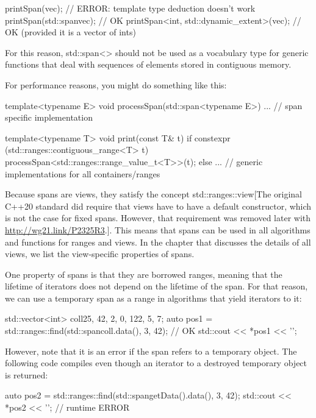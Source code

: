 \begin{cpp}
printSpan(vec); // ERROR: template type deduction doesn’t work
printSpan(std::span{vec}); // OK
printSpan<int, std::dynamic_extent>(vec); // OK (provided it is a vector of ints)
\end{cpp}

For this reason, std::span<> should not be used as a vocabulary type for generic functions that deal with sequences of elements stored in contiguous memory.

For performance reasons, you might do something like this:

\begin{cpp}
template<typename E>
void processSpan(std::span<typename E>) {
	... // span specific implementation
}

template<typename T>
void print(const T& t) {
	if constexpr (std::ranges::contiguous_range<T> t) {
		processSpan<std::ranges::range_value_t<T>>(t);
	}
	else {
		... // generic implementations for all containers/ranges
	}
}
\end{cpp}


Because spans are views, they satisfy the concept std::ranges::view[The original C++20 standard did require that views have to have a default constructor, which is not the case for fixed spans. However, that requirement was removed later with \url{http://wg21.link/P2325R3}.]. This means that spans can be used in all algorithms and functions for ranges and views. In the chapter that discusses the details of all views, we list the view-specific properties of spans.

One property of spans is that they are borrowed ranges, meaning that the lifetime of iterators does not depend on the lifetime of the span. For that reason, we can use a temporary span as a range in algorithms that yield iterators to it:

\begin{cpp}
std::vector<int> coll{25, 42, 2, 0, 122, 5, 7};
auto pos1 = std::ranges::find(std::span{coll.data(), 3}, 42); // OK
std::cout << *pos1 << '\n';
\end{cpp}

However, note that it is an error if the span refers to a temporary object. The following code compiles even though an iterator to a destroyed temporary object is returned:

\begin{cpp}
auto pos2 = std::ranges::find(std::span{getData().data(), 3}, 42);
std::cout << *pos2 << '\n'; // runtime ERROR
\end{cpp}











